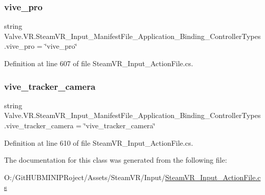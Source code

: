 \subsubsection{\texorpdfstring{vive\_pro}{vive\_pro}}
{\footnotesize\ttfamily string Valve.\+V\+R.\+Steam\+V\+R\+\_\+\+Input\+\_\+\+Manifest\+File\+\_\+\+Application\+\_\+\+Binding\+\_\+\+Controller\+Types.\+vive\+\_\+pro = \char`\"{}vive\+\_\+pro\char`\"{}\hspace{0.3cm}{\ttfamily [static]}}



Definition at line 607 of file Steam\+V\+R\+\_\+\+Input\+\_\+\+Action\+File.\+cs.

\mbox{\label{class_valve_1_1_v_r_1_1_steam_v_r___input___manifest_file___application___binding___controller_types_a6ab34febd86d6586d3375627575f8691}} 
\subsubsection{\texorpdfstring{vive\_tracker\_camera}{vive\_tracker\_camera}}
{\footnotesize\ttfamily string Valve.\+V\+R.\+Steam\+V\+R\+\_\+\+Input\+\_\+\+Manifest\+File\+\_\+\+Application\+\_\+\+Binding\+\_\+\+Controller\+Types.\+vive\+\_\+tracker\+\_\+camera = \char`\"{}vive\+\_\+tracker\+\_\+camera\char`\"{}\hspace{0.3cm}{\ttfamily [static]}}



Definition at line 610 of file Steam\+V\+R\+\_\+\+Input\+\_\+\+Action\+File.\+cs.



The documentation for this class was generated from the following file\+:\begin{DoxyCompactItemize}
\item 
O\+:/\+Git\+H\+U\+B\+M\+I\+N\+I\+P\+Roject/\+Assets/\+Steam\+V\+R/\+Input/\mbox{\hyperlink{_steam_v_r___input___action_file_8cs}{Steam\+V\+R\+\_\+\+Input\+\_\+\+Action\+File.\+cs}}\end{DoxyCompactItemize}
